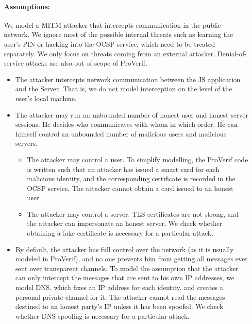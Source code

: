 \paragraph{Assumptions:}

We model a MITM attacker that intercepts communication in the public network. We ignore most of the possible internal threats such as learning the user's PIN or hacking into the OCSP service, which need to be treated separately. We only focus on threats coming from an external attacker. Denial-of-service attacks are also out of scope of ProVerif.

\begin{itemize}
\item The attacker intercepts network communication between the JS application and the Server. That is, we do not model interception on the level of the user's local machine.

\item The attacker may run an unbounded number of honest user and honest server sessions. He decides who communicates with whom in which order. He can himself control an unbounded number of malicious users and malicious servers.
    \begin{itemize}
    \item The attacker may control a user. To simplify modelling, the ProVerif code is written such that an attacker has issued a smart card for each malicious identity, and the corresponding certificate is recorded in the OCSP service. The attacker cannot obtain a card issued to an honest user.
    \item The attacker may control a server. TLS certificates are not strong, and the attacker can impersonate an honest server. We check whether obtaining a fake certificate is necessary for a particular attack.
     \end{itemize}

\item By default, the attacker has full control over the network (as it is usually modeled in ProVerif), and no one prevents him from getting all messages ever sent over transparent channels. To model the assumption that the attacker can only intercept the messages that are sent to his own IP addresses, we model DNS, which fixes an IP address for each identity, and creates a personal private channel for it. The attacker cannot read the messages destined to an honest party's IP unless it has been spoofed. We check whether DNS spoofing is necessary for a particular attack.


\end{itemize}
